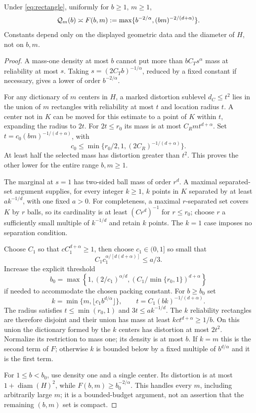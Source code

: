 \begin{proposition}\label{prop:geometry}
Under \eqref{eq:rectangle}, uniformly for $b\ge1$, $m\ge1$,
\begin{equation}\label{eq:regular-profile}
 \mathcal Q_m(b)\asymp
 F(b,m):=\max\{b^{-2/\alpha},(bm)^{-2/(d+\alpha)}\}.
\end{equation}
Constants depend only on the displayed geometric data and the diameter of $H$, not on $b,m$.
\end{proposition}
\begin{proof}
A mass-one density at most $b$ cannot put more than $bC_Ts^\alpha$ mass at reliability at most $s$. Taking $s=(2C_Tb)^{-1/\alpha}$, reduced by a fixed constant if necessary, gives a lower of order $b^{-2/\alpha}$.

For any dictionary of $m$ centers in $H$, a marked distortion sublevel $d_C\le t^2$ lies in the union of $m$ rectangles with reliability at most $t$ and location radius $t$. A center not in $K$ can be moved for this estimate to a point of $K$ within $t$, expanding the radius to $2t$. For $2t\le r_0$ its mass is at most $C_Rm t^{d+\alpha}$. Set $t=c_0(bm)^{-1/(d+\alpha)}$, with
\[
 c_0\le \min\{r_0/2,1,(2C_R)^{-1/(d+\alpha)}\}.
\]
At least half the selected mass has distortion greater than $t^2$. This proves the other lower for the entire range $b,m\ge1$.

The marginal at $s=1$ has two-sided ball mass of order $r^d$. A maximal separated-set argument supplies, for every integer $k\ge1$, $k$ points in $K$ separated by at least $a k^{-1/d}$, with one fixed $a>0$. For completeness, a maximal $r$-separated set covers $K$ by $r$ balls, so its cardinality is at least $(Cr^d)^{-1}$ for $r\le r_0$; choose $r$ a sufficiently small multiple of $k^{-1/d}$ and retain $k$ points. The $k=1$ case imposes no separation condition.

Choose $C_1$ so that $cC_1^{d+\alpha}\ge1$, then choose $c_1\in(0,1]$ so small that
\[
 C_1 c_1^{\alpha/[d(d+\alpha)]}\le a/3.
\]
Increase the explicit threshold
\begin{equation}\label{eq:b-threshold}
 b_0=\max\left\{1,(2/c_1)^{\alpha/d},
        (C_1/\min\{r_0,1\})^{d+\alpha}\right\}
\end{equation}
if needed to accommodate the chosen packing constant. For $b\ge b_0$ set
\[
 k=\min\{m,\lfloor c_1 b^{d/\alpha}\rfloor\},\qquad
 t=C_1(bk)^{-1/(d+\alpha)}.
\]
The radius satisfies $t\le\min(r_0,1)$ and $3t\le a k^{-1/d}$. The $k$ reliability rectangles are therefore disjoint and their union has mass at least $kc t^{d+\alpha}\ge1/b$. On this union the dictionary formed by the $k$ centers has distortion at most $2t^2$. Normalize its restriction to mass one; its density is at most $b$. If $k=m$ this is the second term of $F$; otherwise $k$ is bounded below by a fixed multiple of $b^{d/\alpha}$ and it is the first term.

For $1\le b<b_0$, use density one and a single center. Its distortion is at most $1+\operatorname{diam}(H)^2$, while $F(b,m)\ge b_0^{-2/\alpha}$. This handles every $m$, including arbitrarily large $m$; it is a bounded-budget argument, not an assertion that the remaining $(b,m)$ set is compact.
\end{proof}

